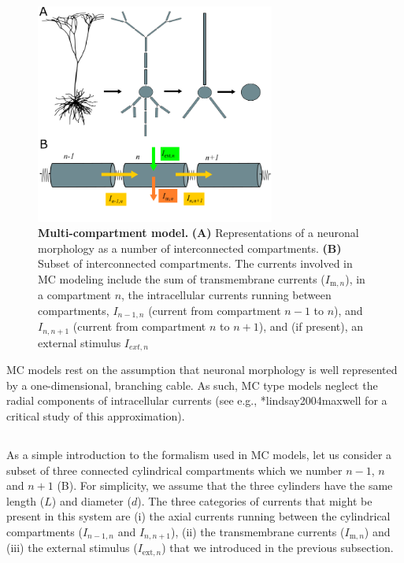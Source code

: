 \begin{figure}[!ht]
\begin{center}
\includegraphics[width=0.7\textwidth]{Figures/Neuron/multikompis.png}
\end{center}
\caption{\textbf{Multi-compartment model.} {\bf (A)} Representations of a neuronal morphology as a number of interconnected compartments. {\bf (B)} Subset of interconnected compartments. The currents involved in MC modeling include the sum of transmembrane currents ($I_{\mathrm{m},n}$), in a compartment $n$, the intracellular currents running between 
compartments, $I_{n-1,n}$ (current from compartment $n-1$ to $n$), and $I_{n,n+1}$ (current from compartment $n$ to $n+1$), and (if present), an external stimulus $I_{ext,n}$ 
}
\label{fig:Neuron:multikompisen}
\end{figure}

MC models rest on the assumption that neuronal morphology is well represented by a one-dimensional, branching cable. As such, MC type models neglect the radial components of intracellular currents (see e.g., \citeasnoun**{lindsay2004maxwell} for a critical study of this approximation). 


\subsection{}
\label{sec:Neuron:Active_multicomp}
As a simple introduction to the formalism used in MC models, let us consider a subset of three connected cylindrical compartments which we number $n-1$, $n$ and $n+1$ (B). For simplicity, we assume that the three cylinders have the same length ($L$) and diameter ($d$). The three categories of currents that might be present in this system are (i) the axial currents running between the cylindrical compartments ($I_{n-1,n}$ and $I_{n,n+1}$), (ii) the transmembrane currents ($I_{\mathrm{m},n}$) and (iii) the external stimulus ($I_{\mathrm{ext},n}$) that we introduced in the previous subsection. 

